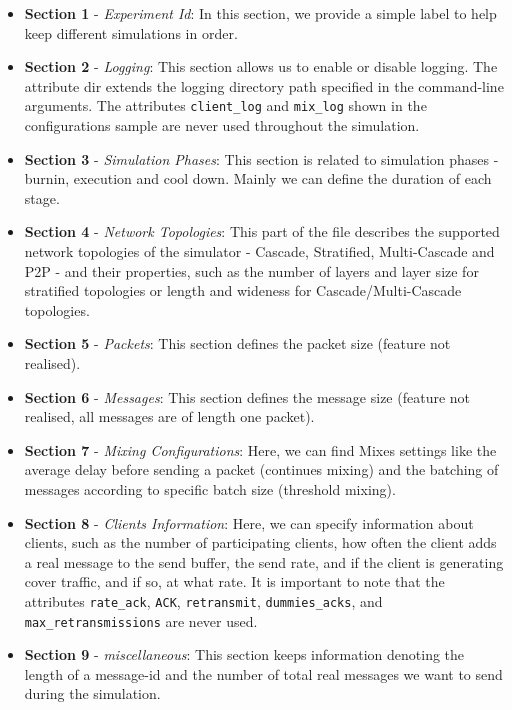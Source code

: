 \documentclass[logo,msc,cyber]{infthesis}   %
\begin{document}
\begin{itemize}
    \item \textbf{Section 1} - \emph{Experiment Id}: In this section, we provide
    a simple label to help keep different simulations in order.
    \item \textbf{Section 2} - \emph{Logging}: This section allows us to enable
    or disable logging. The attribute dir extends the logging directory path
    specified in the command-line arguments. The attributes \texttt{client\_log}
    and \texttt{mix\_log} shown in the configurations sample are never used
    throughout the simulation.
    \item \textbf{Section 3} - \emph{Simulation Phases}:  This section is
    related to simulation phases - burnin, execution and cool down. Mainly we
    can define the duration of each stage.
    \item \textbf{Section 4} - \emph{Network Topologies}:  This part of the file
    describes the supported network topologies of the simulator - Cascade,
    Stratified, Multi-Cascade and P2P - and their properties, such as the number
    of layers and layer size for stratified topologies or length and wideness
    for Cascade/Multi-Cascade topologies.
    \item \textbf{Section 5} - \emph{Packets}: This section defines the packet
    size (feature not realised).
    \item \textbf{Section 6} - \emph{Messages}: This section defines the message
    size (feature not realised, all messages are of length one packet).
    \item \textbf{Section 7} - \emph{Mixing Configurations}: Here, we can find
    Mixes settings like the average delay before sending a packet (continues
    mixing) and the batching of messages according to specific batch size
    (threshold mixing). 
    \item \textbf{Section 8} - \emph{Clients Information}: Here, we can specify
    information about clients, such as the number of participating clients, how
    often the client adds a real message to the send buffer, the send rate, and
    if the client is generating cover traffic, and if so, at what rate. It is
    important to note that the attributes \texttt{rate\_ack}, \texttt{ACK},
    \texttt{retransmit}, \texttt{dummies\_acks}, and
    \texttt{max\_retransmissions} are never used. 
    \item \textbf{Section 9} - \emph{miscellaneous}: This section keeps
    information denoting the length of a message-id and the number of total real
    messages we want to send during the simulation.
\end{itemize}
\end{document}
